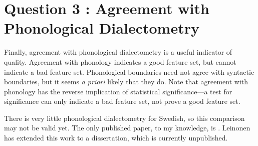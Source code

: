 \section{Question 3 : Agreement with Phonological Dialectometry}

Finally, agreement with phonological dialectometry is a useful
indicator of quality. Agreement with phonology indicates a good
feature set, but cannot indicate a bad feature set. Phonological
boundaries need not agree with syntactic boundaries, but it seems {\it
  a priori} likely that they do. Note that agreement with phonology
has the reverse implication of statistical
significance---a test for significance can only indicate a bad
feature set, not prove a good feature set.

There is very little phonological dialectometry for Swedish, so this
comparison may not be valid yet. The only published paper, to my
knowledge, is . Leinonen has extended this work
to a dissertation, which is currently unpublished.

